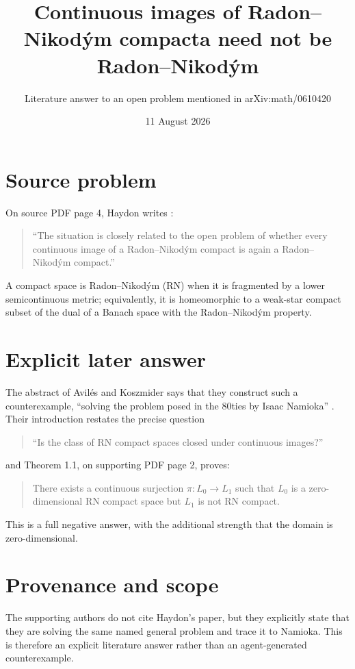 \documentclass[11pt]{article}
\title{Continuous images of Radon--Nikod\'ym compacta need not be Radon--Nikod\'ym}
\author{Literature answer to an open problem mentioned in arXiv:math/0610420}
\date{11 August 2026}
\begin{document}
\maketitle

\begin{center}
\end{center}

\section*{Source problem}
On source PDF page 4, Haydon writes \cite{Haydon}:
\begin{quote}
``The situation is closely related to the open problem of whether every continuous image of a Radon--Nikod\'ym compact is again a Radon--Nikod\'ym compact.''
\end{quote}
A compact space is Radon--Nikod\'ym (RN) when it is fragmented by a lower semicontinuous metric; equivalently, it is homeomorphic to a weak-star compact subset of the dual of a Banach space with the Radon--Nikod\'ym property.

\section*{Explicit later answer}
The abstract of Avil\'es and Koszmider says that they construct such a counterexample, ``solving the problem posed in the 80ties by Isaac Namioka'' \cite{AK}.  Their introduction restates the precise question
\begin{quote}
``Is the class of RN compact spaces closed under continuous images?''
\end{quote}
and Theorem 1.1, on supporting PDF page 2, proves:
\begin{quote}
There exists a continuous surjection $\pi:L_0\to L_1$ such that $L_0$ is a zero-dimensional RN compact space but $L_1$ is not RN compact.
\end{quote}
This is a full negative answer, with the additional strength that the domain is zero-dimensional.

\section*{Provenance and scope}
The supporting authors do not cite Haydon's paper, but they explicitly state that they are solving the same named general problem and trace it to Namioka.  This is therefore an explicit literature answer rather than an agent-generated counterexample.
\end{document}
